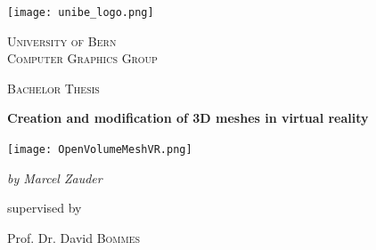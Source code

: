 \documentclass{report}
\begin{document}


\begin{titlepage}
	\centering
	\texttt{[image: unibe\_logo.png]}\par
	\vspace{1cm}
	{\scshape\LARGE University of Bern \\
	\large Computer Graphics Group\par}
	\vspace{1cm}
	{\scshape\Large Bachelor Thesis\par}
	\vspace{1.5cm}
	{\huge\bfseries Creation and modification of 3D meshes in virtual reality\par}
	\vspace{1cm}
	\texttt{[image: OpenVolumeMeshVR.png]}\par 
	\vspace{2cm}
	{\Large\itshape by Marcel Zauder\par}
	\vfill
	supervised by\par
	Prof. Dr. David \textsc{Bommes}
\end{titlepage}

\begin{abstract}
	\textit{Virtual Reality technology experienced a boom in the last ten years and many different kinds of programs emerged that can be used in the virtual environment. Especially for sketching and drawing this kind of software is well perceived. OpenVolumeMeshVR is such a Virtual Reality mesh sketching application to have a utility for OpenVolumeMesh structures to be designed. The user is enabled to generate simple OpenVolumeMesh structures which also can be modified and viewed. During the development of OVMVR a study for how intuitively a certain approach of controlling a VR application is performed, using already existing software as a reference, and the findings are incorporated in the final application. Additionally, an algorithm for finding cells within a given mesh structure is integrated along with other features.}
	
\end{abstract}

\tableofcontents
\end{document}
